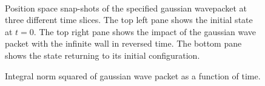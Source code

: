 \documentclass[singlepage,notitlepage,nofootinbib,11pt]{revtex4-1}
\begin{document}
\begin{figure}[h]
  \centering
  \captionsetup[subfigure]{labelformat=empty}
  \\
  \caption{\label{evolution} Position space snap-shots of the specified gaussian wavepacket at three different time slices. The top left pane shows the initial state at $t=0$. The top right pane shows the impact of the gaussian wave packet with the infinite wall in reversed time. The bottom pane shows the state returning to its initial configuration.}
\end{figure}
\begin{figure}[h]
  \centering
  \captionsetup[subfigure]{labelformat=empty}
  \caption{\label{unitarity} Integral norm squared of gaussian wave packet as a function of time. }
\end{figure}
\clearpage
\end{document}

